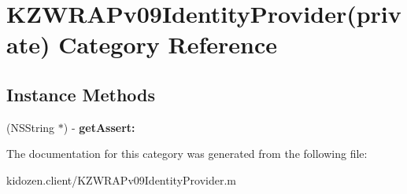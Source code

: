\hypertarget{category_k_z_w_r_a_pv09_identity_provider_07private_08}{\section{K\-Z\-W\-R\-A\-Pv09\-Identity\-Provider(private) Category Reference}
\label{category_k_z_w_r_a_pv09_identity_provider_07private_08}
}
\subsection*{Instance Methods}
\begin{DoxyCompactItemize}
\item 
\hypertarget{category_k_z_w_r_a_pv09_identity_provider_07private_08_a590cc069c9ca4c6f581d687ae8f8e484}{(N\-S\-String $\ast$) -\/ {\bfseries get\-Assert\-:}}\label{category_k_z_w_r_a_pv09_identity_provider_07private_08_a590cc069c9ca4c6f581d687ae8f8e484}

\end{DoxyCompactItemize}


The documentation for this category was generated from the following file\-:\begin{DoxyCompactItemize}
\item 
kidozen.\-client/K\-Z\-W\-R\-A\-Pv09\-Identity\-Provider.\-m\end{DoxyCompactItemize}
